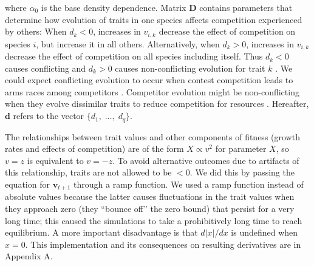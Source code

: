\noindent where $\alpha_0$ is the base density dependence.
Matrix $\mathbf{D}$ contains parameters that determine how evolution of traits
in one species affects competition experienced by others:
When $d_k < 0$, increases in $v_{i,k}$ decrease the
effect of competition on species $i$, but increase it in all others.
Alternatively, when $d_k > 0$, increases in $v_{i,k}$ decrease the effect of
competition on all species including itself.
Thus $d_k < 0$ causes conflicting and $d_k > 0$ causes non-conflicting evolution
for trait $k$ \citep{Northfield:2013if}.
We could expect conflicting evolution to occur when contest competition
leads to arms races among competitors
\citep{Abrams:1994th}.
Competitor evolution might be non-conflicting when they evolve
dissimilar traits to reduce competition for resources \citep{Roughgarden:1976eh}.
Hereafter, $\mathbf{d}$ refers to the vector $\{d_1, \; \ldots, \; d_q \}$.


The relationships between trait values and other components of fitness
(growth rates and effects of competition) are of the form
$X \propto v^2$ for parameter $X$, so $v = z$ is equivalent to $v = -z$.
To avoid alternative outcomes due to artifacts of this relationship,
traits are not allowed to be $< 0$.
We did this by passing the equation for $\mathbf{v}_{t+1}$ through a
ramp function.
We used a ramp function instead of absolute values
because the latter causes fluctuations
in the trait values when they approach zero (they ``bounce off''
the zero bound) that persist for a very long time;
this caused the simulations to take a prohibitively long time to reach
equilibrium.
A more important disadvantage is that $d \lvert x \rvert / dx$ is
undefined when $x = 0$.
This implementation and its consequences on resulting derivatives are in
Appendix A.




%



